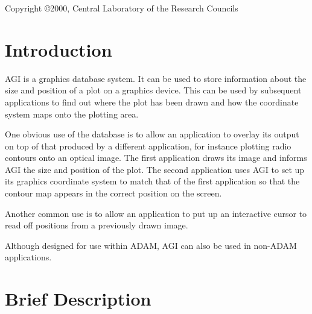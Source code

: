 \documentclass[twoside,11pt]{article}
\newcommand{\stardocinitials}  {SUN}
\newcommand{\stardocnumber}    {48.8}
\newcommand{\stardocabstract}  {}
\newcommand{\stardocname}{\stardocinitials /\stardocnumber}
\newenvironment{latexonly}{}{}
\renewcommand{\_}{\texttt{\symbol{95}}}
\renewcommand{\thepage}{\roman{page}}
\begin{document}
\stardocabstract
  \newpage
  \begin{latexonly}
    \setlength{\parskip}{0mm}
    \tableofcontents
    \setlength{\parskip}{\medskipamount}
    \markboth{\stardocname}{\stardocname}
  \end{latexonly}
%
%
\vfill
Copyright \copyright 2000, Central Laboratory of the Research Councils
\cleardoublepage
\renewcommand{\thepage}{\arabic{page}}
\setcounter{page}{1}


\section {Introduction}

AGI is a graphics database system. It can be used to store information
about the size and position of a plot on a graphics device. This can be
used by subsequent applications to find out where the plot has been drawn
and how the coordinate system maps onto the plotting area.

One obvious use of the database is to allow an application to overlay
its output on top of that produced by a different application, for instance
plotting radio contours onto an optical image. The first application draws
its image and informs AGI the size and position of the plot. The second
application uses AGI to set up its graphics coordinate system to match
that of the first application so that the contour map appears in the
correct position on the screen.

Another common use is to allow an application to put up an interactive
cursor to read off positions from a previously drawn image.

Although designed for use within ADAM, AGI can also be used in non-ADAM
applications.

\section {Brief Description \label{descript}}
\end{document}

